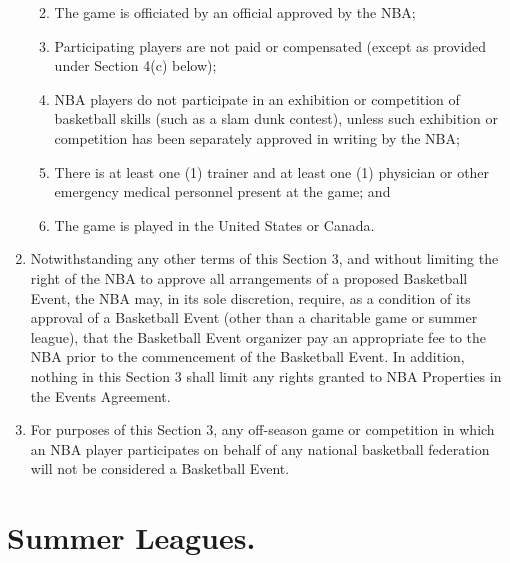 \documentclass[
]{book}
\providecommand{\tightlist}{%
  \setlength{\itemsep}{0pt}\setlength{\parskip}{0pt}}
\begin{document}
\begin{enumerate}
  \begin{enumerate}
  \def\labelenumii{(\roman{enumii})}
  \tightlist
  \item
    The game is officiated by an official approved by the NBA;
  \item
    Participating players are not paid or compensated (except as provided under Section 4(c) below);
  \item
    NBA players do not participate in an exhibition or competition of basketball skills (such as a slam dunk contest), unless such exhibition or competition has been separately approved in writing by the NBA;
  \item
    There is at least one (1) trainer and at least one (1) physician or other emergency medical personnel present at the game; and
  \item
    The game is played in the United States or Canada.
  \end{enumerate}
\item
  Notwithstanding any other terms of this Section 3, and without limiting the right of the NBA to approve all arrangements of a proposed Basketball Event, the NBA may, in its sole discretion, require, as a condition of its approval of a Basketball Event (other than a charitable game or summer league), that the Basketball Event organizer pay an appropriate fee to the NBA prior to the commencement of the Basketball Event. In addition, nothing in this Section 3 shall limit any rights granted to NBA Properties in the Events Agreement.
\item
  For purposes of this Section 3, any off-season game or competition in which an NBA player participates on behalf of any national basketball federation will not be considered a Basketball Event.
\end{enumerate}

\hypertarget{summer-leagues.}{%
\section{Summer Leagues.}\label{summer-leagues.}}
\end{document}
